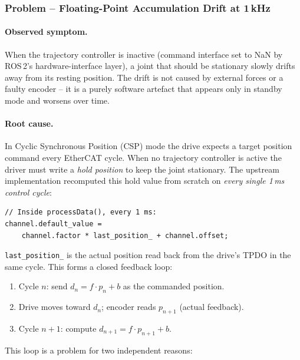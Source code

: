 \documentclass[11pt,a4paper]{article}
\begin{document}
\subsubsection{Problem -- Floating-Point Accumulation Drift at 1\,kHz}

\paragraph{Observed symptom.}
When the trajectory controller is inactive (command interface set to NaN by
ROS\,2's hardware-interface layer), a joint that should be stationary slowly
drifts away from its resting position.  The drift is not caused by external
forces or a faulty encoder -- it is a purely software artefact that appears
only in standby mode and worsens over time.

\paragraph{Root cause.}
In Cyclic Synchronous Position (CSP) mode the drive expects a target position
command every EtherCAT cycle.  When no trajectory controller is active the
driver must write a \emph{hold position} to keep the joint stationary.  The
upstream implementation recomputed this hold value from scratch on \emph{every
single 1\,ms control cycle}:

\begin{lstlisting}[caption={Upstream hold-position code executed at 1\,kHz (buggy)}]
// Inside processData(), every 1 ms:
channel.default_value =
    channel.factor * last_position_ + channel.offset;
\end{lstlisting}

\noindent
\texttt{last\_position\_} is the actual position read back from the drive's
TPDO in the same cycle.  This forms a closed feedback loop:

\begin{enumerate}
  \item Cycle $n$: send $d_n = f \cdot p_n + b$ as the commanded position.
  \item Drive moves toward $d_n$; encoder reads $p_{n+1}$ (actual feedback).
  \item Cycle $n+1$: compute $d_{n+1} = f \cdot p_{n+1} + b$.
\end{enumerate}

\noindent
This loop is a problem for two independent reasons:
\end{document}
